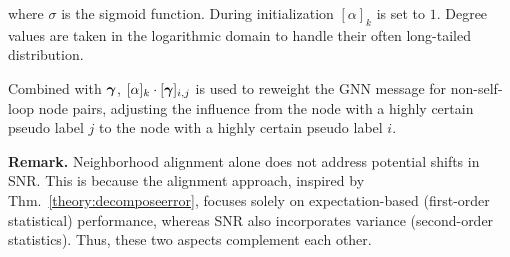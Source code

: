 where $\sigma$ is the sigmoid function. 
During initialization $[\alpha]_{k}$ is set to $1$.
Degree values are taken in the logarithmic domain to handle their often long-tailed distribution. 

Combined with $\boldsymbol{\gamma}$, $[\alpha]_{k}\cdot[\boldsymbol{\gamma}]_{i,j}$ is used to reweight the GNN message for non-self-loop node pairs, adjusting the influence from the node with a highly certain pseudo label $j$ to the node with a highly certain pseudo label $i$.


\textbf{Remark.} Neighborhood alignment alone does not address potential shifts in SNR. This is because the alignment approach, inspired by Thm.~\ref{theory:decomposeerror}, focuses solely on expectation-based (first-order statistical) performance, whereas SNR also incorporates variance (second-order statistics). Thus, these two aspects complement each other. 



